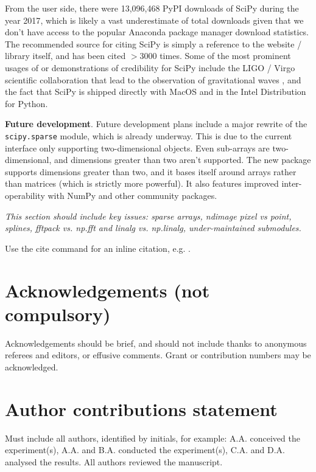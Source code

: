 \documentclass[fleqn,10pt]{wlscirep}
\begin{document}
From the user side, there were 13,096,468 PyPI downloads
of SciPy during the year 2017\cite{pypinfo}, which is likely a vast
underestimate of total downloads given that we don't have access to the
popular Anaconda package manager download statistics. The recommended 
source for citing SciPy is simply a reference to the website / library
itself\cite{SciPylib}, and has been cited $>3000$ times. Some of the most
prominent usages of or demonstrations of credibility for SciPy include the LIGO / Virgo
scientific collaboration that lead to the observation of gravitational
waves \cite{PhysRevLett.116.061102}, and the fact that SciPy is shipped directly
with MacOS and in the Intel Distribution for Python\cite{intel-python}. 

\textbf{Future development}.
Future development plans include a major rewrite of the \texttt{scipy.sparse} module, which is already underway\cite{abbasi2018sparse}. This is due to the current interface only supporting two-dimensional objects. Even sub-arrays are two-dimensional, and dimensions greater than two aren't supported. The new package supports dimensions greater than two, and it bases itself around arrays rather than matrices (which is strictly more powerful). It also features improved inter-operability with NumPy and other community packages.

\textit{This section should include key issues: sparse arrays, ndimage pixel vs point, splines, fftpack vs. np.fft and linalg vs. np.linalg, under-maintained submodules.}




\noindent Use the cite command for an inline citation, e.g. \cite{behnel2011cython}.

\section*{Acknowledgements (not compulsory)}

Acknowledgements should be brief, and should not include thanks to anonymous referees and editors, or effusive comments. Grant or contribution numbers may be acknowledged.

\section*{Author contributions statement}

Must include all authors, identified by initials, for example:
A.A. conceived the experiment(s),  A.A. and B.A. conducted the experiment(s), C.A. and D.A. analysed the results.  All authors reviewed the manuscript.
\end{document}
